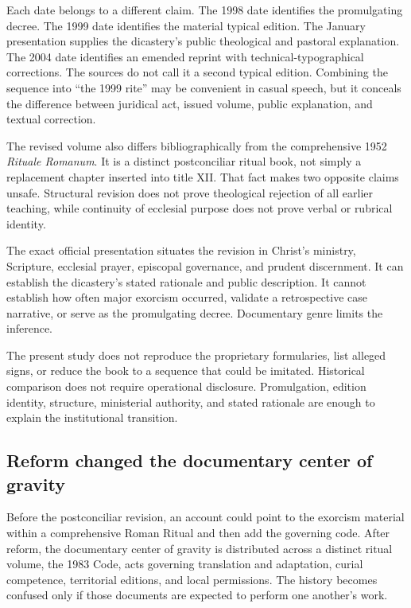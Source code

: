 Each date belongs to a different claim. The 1998 date identifies the
promulgating decree. The 1999 date identifies the material typical edition.
The January presentation supplies the dicastery's public theological and
pastoral explanation. The 2004 date identifies an emended reprint with
technical-typographical corrections. The sources do not call it a second
typical edition. Combining
the sequence into ``the 1999 rite'' may be convenient in casual speech, but it
conceals the difference between juridical act, issued volume, public
explanation, and textual correction.

The revised volume also differs bibliographically from the comprehensive 1952
\emph{Rituale Romanum}. It is a distinct postconciliar ritual book, not simply
a replacement chapter inserted into title XII. That fact makes two opposite
claims unsafe. Structural revision does not prove theological rejection of
all earlier teaching, while continuity of ecclesial purpose does not prove
verbal or rubrical identity.

The exact official presentation situates the revision in Christ's ministry,
Scripture, ecclesial prayer, episcopal governance, and prudent discernment.
It can establish the dicastery's stated rationale and public description. It
cannot establish how often major exorcism occurred, validate a retrospective
case narrative, or serve as the promulgating decree. Documentary genre limits
the inference.

The present study does not reproduce the proprietary formularies, list alleged
signs, or reduce the book to a sequence that could be imitated. Historical
comparison does not require operational disclosure. Promulgation, edition
identity, structure, ministerial authority, and stated rationale are enough to
explain the institutional transition.

\subsection{Reform changed the documentary center of gravity}

Before the postconciliar revision, an account could point to the exorcism
material within a comprehensive Roman Ritual and then add the governing code.
After reform, the documentary center of gravity is distributed across a
distinct ritual volume, the 1983 Code, acts governing translation and
adaptation, curial competence, territorial editions, and local permissions.
The history becomes confused only if those documents are expected to perform
one another's work.

